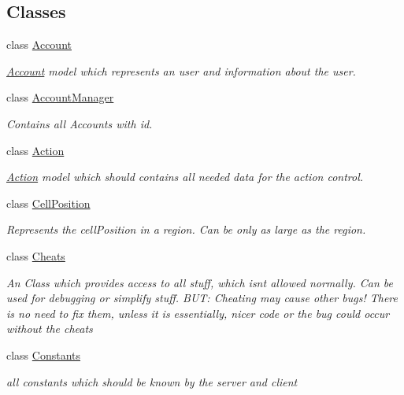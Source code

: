 \subsection*{Classes}
\begin{DoxyCompactItemize}
\item 
class \hyperlink{classCore_1_1Models_1_1Account}{Account}
\begin{DoxyCompactList}\small\item\em \hyperlink{classCore_1_1Models_1_1Account}{Account} model which represents an user and information about the user. \end{DoxyCompactList}\item 
class \hyperlink{classCore_1_1Models_1_1AccountManager}{Account\+Manager}
\begin{DoxyCompactList}\small\item\em Contains all Accounts with id. \end{DoxyCompactList}\item 
class \hyperlink{classCore_1_1Models_1_1Action}{Action}
\begin{DoxyCompactList}\small\item\em \hyperlink{classCore_1_1Models_1_1Action}{Action} model which should contains all needed data for the action control. \end{DoxyCompactList}\item 
class \hyperlink{classCore_1_1Models_1_1CellPosition}{Cell\+Position}
\begin{DoxyCompactList}\small\item\em Represents the cell\+Position in a region. Can be only as large as the region. \end{DoxyCompactList}\item 
class \hyperlink{classCore_1_1Models_1_1Cheats}{Cheats}
\begin{DoxyCompactList}\small\item\em An Class which provides access to all stuff, which isn\textquotesingle{}t allowed normally. Can be used for debugging or simplify stuff. B\+U\+T\+: Cheating may cause other bugs! There is no need to fix them, unless it is essentially, nicer code or the bug could occur without the cheats \end{DoxyCompactList}\item 
class \hyperlink{classCore_1_1Models_1_1Constants}{Constants}
\begin{DoxyCompactList}\small\item\em all constants which should be known by the server and client \end{DoxyCompactList}\item 

\end{DoxyCompactItemize}
